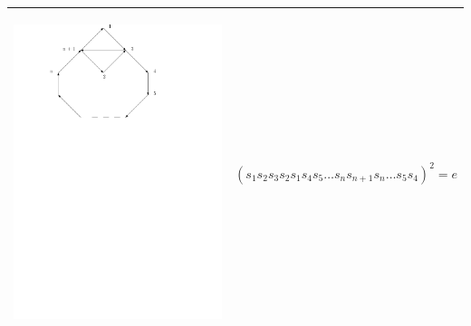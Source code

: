 \documentclass[11pt]{amsart}
\theoremstyle{definition}
\begin{document}
\begin{table}[h]
\begin{tabular}{| p{3.5cm} | p{7cm} |}
\begin{center}\includegraphics[scale = .30]{Diagram2.pdf}\end{center} 
& $(s_{1}s_{2}s_{3}s_{2}s_{1}s_{4}s_{5} \dots s_{n}s_{n+1}s_{n} \dots s_{5}s_{4})^{2} = e$ \\ \hline


\end{tabular}
\end{table}
\end{document}
